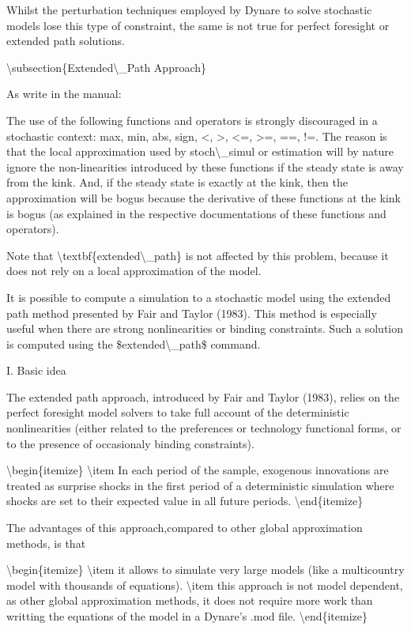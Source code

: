 \documentclass[10pt,math=newtx,citestyle=gb7714-2015,bibstyle=gb7714-2015]{elegantbook}
\begin{document}
	Whilst the perturbation techniques employed by Dynare to solve stochastic models lose this type of constraint, the same is not true for perfect foresight or extended path solutions.
	
	
	\textbackslash{}subsection\{Extended\textbackslash{}\_Path Approach\}
	
	As write in the manual:
	
	The use of the following functions and operators is strongly discouraged in a stochastic context: max, min, abs, sign, <, >, <=, >=, ==, !=. The reason is that the local approximation used by stoch\textbackslash{}\_simul or estimation will by nature ignore the non-linearities introduced by these functions if the steady state is away from the kink. And, if the steady state is exactly at the kink, then the approximation will be bogus because the derivative of these functions at the kink is bogus (as explained in the respective documentations of these functions and operators).
	
	Note that \textbackslash{}textbf\{extended\textbackslash{}\_path\} is not affected by this problem, because it does not rely on a local approximation of the model.
	
	It is possible to compute a simulation to a stochastic model using the extended path method presented by Fair and Taylor (1983). This method is especially useful when there are strong nonlinearities or binding constraints. Such a solution is computed using the \$extended\textbackslash{}\_path\$ command.
	
	I. Basic idea
	
	The extended path approach, introduced by Fair and Taylor (1983), relies on the perfect foresight model solvers to take full account of the deterministic nonlinearities (either related to the preferences or technology functional forms, or to the presence of occasionaly binding constraints).
	
	\textbackslash{}begin\{itemize\}
	\textbackslash{}item In each period of the sample, exogenous innovations are treated as surprise shocks in the first period of a deterministic simulation where shocks are set to their expected value in all future periods.
	\textbackslash{}end\{itemize\}
	
	The advantages of this approach,compared to other global approximation methods, is that
	
	\textbackslash{}begin\{itemize\}
	\textbackslash{}item it allows to simulate very large models (like a multicountry model with thousands of equations).
	\textbackslash{}item this approach is not model dependent, as other global approximation methods, it does not require more work than writting the equations of the model in a Dynare’s .mod file.
	\textbackslash{}end\{itemize\}
	
\end{document}
